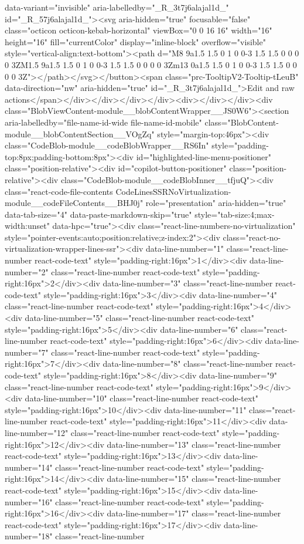 {{{{{{{data-variant="invisible" aria-labelledby="_R_3t7j6alajal1d_" id="_R_57j6alajal1d_"><svg aria-hidden="true" focusable="false" class="octicon octicon-kebab-horizontal" viewBox="0 0 16 16" width="16" height="16" fill="currentColor" display="inline-block" overflow="visible" style="vertical-align:text-bottom"><path d="M8 9a1.5 1.5 0 1 0 0-3 1.5 1.5 0 0 0 0 3ZM1.5 9a1.5 1.5 0 1 0 0-3 1.5 1.5 0 0 0 0 3Zm13 0a1.5 1.5 0 1 0 0-3 1.5 1.5 0 0 0 0 3Z"></path></svg></button><span class="prc-TooltipV2-Tooltip-tLeuB" data-direction="nw" aria-hidden="true" id="_R_3t7j6alajal1d_">Edit and raw actions</span></div></div></div></div><div></div></div><div class="BlobViewContent-module__blobContentWrapper__JS0W6"><section aria-labelledby="file-name-id-wide file-name-id-mobile" class="BlobContent-module__blobContentSection__VOgZq" style="margin-top:46px"><div class="CodeBlob-module__codeBlobWrapper__RS6In" style="padding-top:8px;padding-bottom:8px"><div id="highlighted-line-menu-positioner" class="position-relative"><div id="copilot-button-positioner" class="position-relative"><div class="CodeBlob-module__codeBlobInner__tfjuQ"><div class="react-code-file-contents CodeLinesSSRNoVirtualization-module__codeFileContents__BHJ0j" role="presentation" aria-hidden="true" data-tab-size="4" data-paste-markdown-skip="true" style="tab-size:4;max-width:unset" data-hpc="true"><div class="react-line-numbers-no-virtualization" style="pointer-events:auto;position:relative;z-index:2"><div class="react-no-virtualization-wrapper-lines-ssr"><div data-line-number="1" class="react-line-number react-code-text" style="padding-right:16px">1</div><div data-line-number="2" class="react-line-number react-code-text" style="padding-right:16px">2</div><div data-line-number="3" class="react-line-number react-code-text" style="padding-right:16px">3</div><div data-line-number="4" class="react-line-number react-code-text" style="padding-right:16px">4</div><div data-line-number="5" class="react-line-number react-code-text" style="padding-right:16px">5</div><div data-line-number="6" class="react-line-number react-code-text" style="padding-right:16px">6</div><div data-line-number="7" class="react-line-number react-code-text" style="padding-right:16px">7</div><div data-line-number="8" class="react-line-number react-code-text" style="padding-right:16px">8</div><div data-line-number="9" class="react-line-number react-code-text" style="padding-right:16px">9</div><div data-line-number="10" class="react-line-number react-code-text" style="padding-right:16px">10</div><div data-line-number="11" class="react-line-number react-code-text" style="padding-right:16px">11</div><div data-line-number="12" class="react-line-number react-code-text" style="padding-right:16px">12</div><div data-line-number="13" class="react-line-number react-code-text" style="padding-right:16px">13</div><div data-line-number="14" class="react-line-number react-code-text" style="padding-right:16px">14</div><div data-line-number="15" class="react-line-number react-code-text" style="padding-right:16px">15</div><div data-line-number="16" class="react-line-number react-code-text" style="padding-right:16px">16</div><div data-line-number="17" class="react-line-number react-code-text" style="padding-right:16px">17</div><div data-line-number="18" class="react-line-number }}}}}}}
